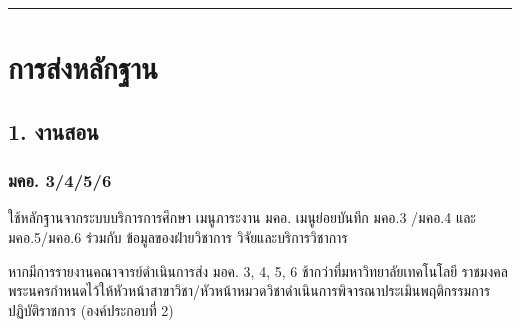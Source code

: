 \documentclass[a4paper,12pt,english]{sphinxmanual}
\begin{document}
\bigskip\hrule\bigskip



\section{การส่งหลักฐาน}
\label{\detokenize{submission_part1:id2}}

\subsection{1. งานสอน}
\label{\detokenize{submission_part1:id3}}

\subsubsection{มคอ. 3/4/5/6}
\label{\detokenize{submission_part1:id4}}
ใช้หลักฐานจากระบบบริการการศึกษา เมนูภาระงาน มคอ. เมนูย่อยบันทึก มคอ.3 /มคอ.4  และ มคอ.5/มคอ.6 ร่วมกับ ข้อมูลของฝ่ายวิชาการ วิจัยและบริการวิชาการ

หากมีการรายงานคณาจารย์ดำเนินการส่ง มอค. 3, 4, 5, 6 ช้ากว่าที่มหาวิทยาลัยเทคโนโลยี
ราชมงคลพระนครกำหนดไว้ให้หัวหน้าสาขาวิชา/หัวหน้าหมวดวิชาดำเนินการพิจารณาประเมินพฤติกรรมการปฏิบัติราชการ (องค์ประกอบที่ 2)
\end{document}
